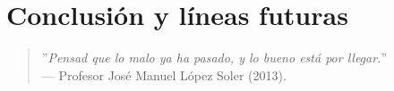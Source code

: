 \chapter{Conclusión y líneas futuras}
\label{cap:capitulo7}

\begin{quote}
	\begin{flushright}
		\small ''\textit{Pensad que lo malo ya ha pasado, y lo bueno está por llegar.}'' \\
		--- Profesor José Manuel López Soler (2013).
	\end{flushright}
\end{quote}



\newpage
\clearpage{\pagestyle{empty}\cleardoublepage}